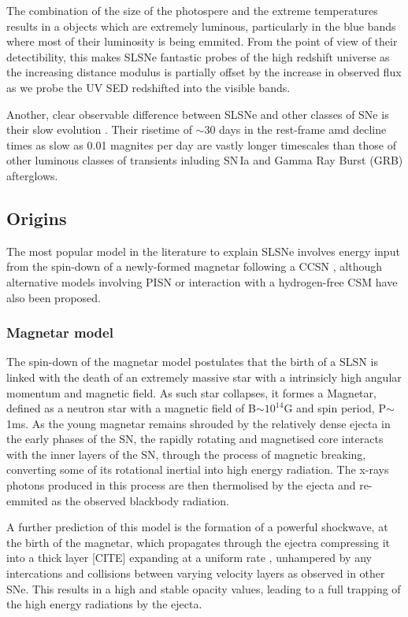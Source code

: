 The combination of the size of the photospere and the extreme temperatures results in a objects which are extremely luminous, particularly in the blue bands where most of their luminosity is being emmited. From the point of view of their detectibility, this makes SLSNe fantastic probes of the high redshift universe as the increasing distance modulus is partially offset by the increase in observed flux as we probe the UV SED redshifted into the visible bands.

Another, clear observable difference between SLSNe and other classes of SNe is their slow evolution \citep{Gal-Yam2009, Inserra2013, Nicholl2015a}. Their risetime of $\sim$30 days in the rest-frame amd decline times as slow as 0.01 magnites per day are vastly longer timescales than those of other luminous classes of transients inluding SN\,Ia and Gamma Ray Burst (GRB) afterglows.

\subsection{Origins} \label{sec:Origins}
The most popular model in the literature to explain SLSNe involves energy input from the spin-down of a newly-formed magnetar following a CCSN \citep{Kasen2009,Woosley2010,Inserra2013}, although alternative models involving PISN \citep{Woosley2007,Yan2015} or interaction with a hydrogen-free CSM \citep{Chevalier2011,Chatzopoulos2013,Sorokina2015} have also been proposed.

\subsubsection{Magnetar model}
The spin-down of the magnetar model postulates that the birth of a SLSN is linked with the death of an extremely massive star with a intrinsicly high angular momentum and magnetic field. As such star collapses, it formes a Magnetar, defined as a neutron star with a magnetic field of B$\sim10^{14}$G and spin period, P$\sim$1ms. As the young magnetar remains shrouded by the relatively dense ejecta in the early phases of the SN, the rapidly rotating and magnetised core interacts with the inner layers of the SN, through the process of magnetic breaking, converting some of its rotational inertial into high energy radiation. The x-rays photons produced in this process are then thermolised by the ejecta and re-emmited as the observed blackbody radiation.

A further prediction of this model is the formation of a powerful shockwave, at the birth of the magnetar, which propagates through the ejectra compressing it into a thick layer [CITE] expanding at a uniform rate \citep{Inserra2013}, unhampered by any intercations and collisions between varying velocity layers as observed in other SNe. This results in a high and stable opacity values, leading to a full trapping of the high energy radiations by the ejecta.


